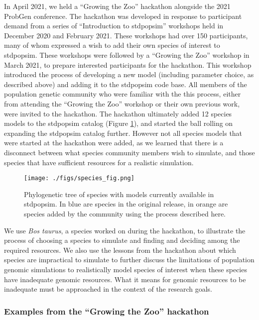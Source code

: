 \documentclass[hidelinks]{article}
\begin{document}
In April 2021, we held a ``Growing the Zoo'' hackathon 
alongside the 2021 ProbGen conference. 
The hackathon was developed in response to participant demand from a
series of ``Introduction to stdpopsim'' workshops held in December 2020 and
February 2021. These workshops had over 150 participants, many of whom
expressed a wish to add their own species of interest to stdpopsim.
These workshops were followed by a ``Growing the Zoo'' workshop in
March 2021, to prepare interested participants for the hackathon. This
workshop introduced the process of developing a new model (including
parameter choice, as described above) and adding it to the stdpopsim
code base. All members of the population genetic community who were 
familiar with the this process, either from attending the
``Growing the Zoo'' workshop or their own previous work, were invited to
the hackathon. The hackathon ultimately added 12 species models to
the stdpopsim catalog (Figure \ref{fig:tree}), and started the ball rolling on expanding the
stdpopsim catalog further. However not all species models that were started
at the hackathon were added, as we learned that there is a disconnect
between what species community members wish to simulate, and those
species that have sufficient resources for a realistic simulation.

\begin{figure}
  \texttt{[image: ./figs/species\_fig.png]}
  \caption{Phylogenetic tree of species with models currently available in stdpopsim. 
           In blue are species in the original release, in orange are species added 
           by the community using the process described here.}
  \label{fig:tree}
\end{figure}

We use \emph{Bos taurus}, a species worked on during the hackathon, to
illustrate the process of choosing a species to simulate and finding and
deciding among the required resources. We also use the lessons from the
hackathon about which species are impractical to simulate to further
discuss the limitations of population genomic simulations to
realistically model species of interest when these species have
inadequate genomic resources. What it means for genomic resources to
be inadequate must be approached in the context of the research goals.

\hypertarget{examples-from-the-growing-the-zoo-hackathon}{%
\subsubsection*{Examples from the ``Growing the Zoo''
hackathon}\label{examples-from-the-growing-the-zoo-hackathon}}
\end{document}
